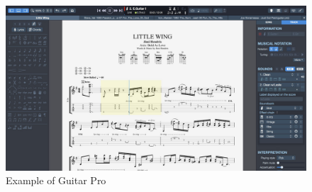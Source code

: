 \documentclass[10pt,twocolumn,letterpaper]{article}
\begin{document}
\begin{CJK}{UTF8}{bsmi}
\begin{figure}[t]
\begin{center}
   \includegraphics[width=0.8\linewidth]{gp75.jpg}
\end{center}
   \caption{Example of Guitar Pro\cite{GuitarPro}}
\label{fig:long}
\label{fig:gp75}
\end{figure}

{\small


}

\end{CJK}
\end{document}

